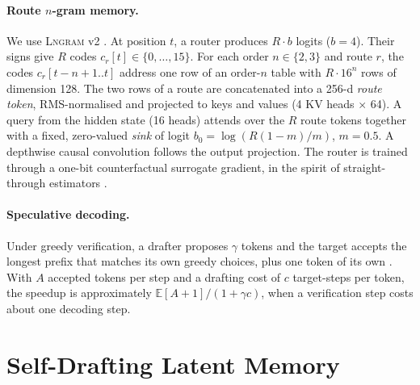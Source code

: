 \documentclass[11pt]{article}
\newcommand{\Lngram}{\textsc{Lngram}}
\begin{document}
\paragraph{Route $n$-gram memory.}
We use \Lngram{} v2 \citep{lngram}. At position $t$, a router produces $R\cdot b$ logits ($b{=}4$). Their signs give $R$
codes $c_r[t]\in\{0,\dots,15\}$. For each order $n\in\{2,3\}$ and route $r$, the codes $c_r[t-n+1..t]$ address one row of an
order-$n$ table with $R\cdot16^n$ rows of dimension 128. The two rows of a route are concatenated into a 256-d \emph{route
token}, RMS-normalised \citep{zhang2019rmsnorm} and projected to keys and values (4 KV heads $\times$ 64). A query from the
hidden state (16 heads) attends over the $R$ route tokens together with a fixed, zero-valued \emph{sink} of logit
$b_0=\log(R(1-m)/m)$, $m{=}0.5$. A depthwise causal convolution follows the output projection. The router is trained
through a one-bit counterfactual surrogate gradient, in the spirit of straight-through estimators
\citep{bengio2013estimating}.

\paragraph{Speculative decoding.}
Under greedy verification, a drafter proposes $\gamma$ tokens and the target accepts the longest prefix that matches its
own greedy choices, plus one token of its own \citep{leviathan2023fast}. With $A$ accepted tokens per step and a drafting
cost of $c$ target-steps per token, the speedup is approximately $\mathbb{E}[A{+}1]/(1+\gamma c)$, when a verification step
costs about one decoding step.

\section{Self-Drafting Latent Memory}
\label{sec:method}
\end{document}
